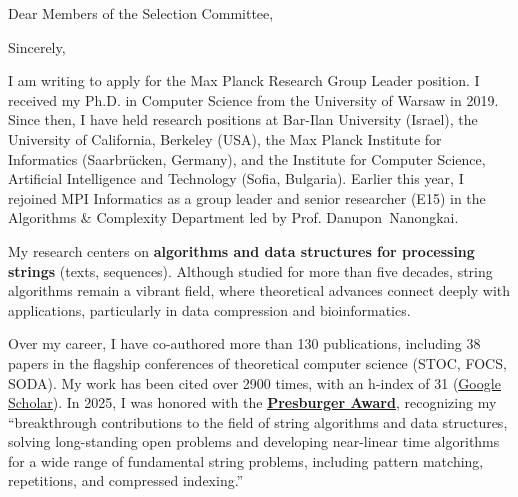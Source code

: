 \documentclass[11pt,a4paper,sans]{moderncv}
\title{\vphantom{Title}}
\begin{document}
\date{October 14th, 2025}
\opening{Dear Members of the Selection Committee,}
\subject{Application for a Max Planck Research Group: Cover Letter}
\closing{Sincerely,}
\makelettertitle

I am writing to apply for the Max Planck Research Group Leader position. I received my Ph.D. in Computer Science from the University of Warsaw in 2019. Since then, I have held research positions at Bar-Ilan University (Israel), the University of California, Berkeley (USA), the Max Planck Institute for Informatics (Saarbrücken, Germany), and the Institute for Computer Science, Artificial Intelligence and Technology (Sofia, Bulgaria). Earlier this year, I rejoined MPI Informatics as a group leader and senior researcher (E15) in the Algorithms \& Complexity Department led by Prof. Danupon~Nanongkai.

My research centers on \textbf{algorithms and data structures for processing strings} (texts, sequences). Although studied for more than five decades, string algorithms remain a vibrant field, where theoretical advances connect deeply with applications, particularly in data compression and bioinformatics.

Over my career, I have co-authored more than 130 publications, including 38 papers in the flagship conferences of theoretical computer science (STOC, FOCS, SODA). My work has been cited over 2900 times, with an h-index of 31 (\underline{\href{https://scholar.google.com/citations?user=mudtARsAAAAJ}{Google
 Scholar}}). In 2025, I was honored with the \underline{\href{https://eatcs.org/index.php/presburger}{\textbf{Presburger
 Award}}}, recognizing my “breakthrough contributions to the field of string algorithms and data structures, solving long-standing open problems and developing near-linear time algorithms for a wide range of fundamental string problems, including pattern matching, repetitions, and compressed indexing.”
\end{document}
